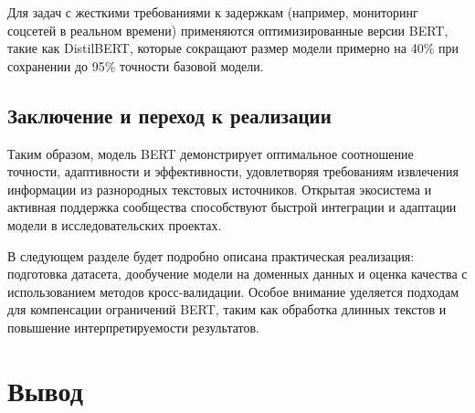 Для задач с жесткими требованиями к задержкам (например, мониторинг соцсетей в реальном времени) применяются оптимизированные версии BERT, такие как DistilBERT, которые сокращают размер модели примерно на 40\% при сохранении до 95\% точности базовой модели.

\subsection{Заключение и переход к реализации}

Таким образом, модель BERT демонстрирует оптимальное соотношение точности, адаптивности и эффективности, удовлетворяя требованиям извлечения информации из разнородных текстовых источников. Открытая экосистема и активная поддержка сообщества способствуют быстрой интеграции и адаптации модели в исследовательских проектах.

В следующем разделе будет подробно описана практическая реализация: подготовка датасета, дообучение модели на доменных данных и оценка качества с использованием методов кросс-валидации. Особое внимание уделяется подходам для компенсации ограничений BERT, таким как обработка длинных текстов и повышение интерпретируемости результатов.

\section*{Вывод}


\clearpage

